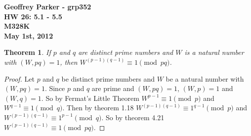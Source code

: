 \documentclass[12pt,leqno]{article}
\numberwithin{equation}{section}
\newtheorem{thm}{Theorem}[section]
\theoremstyle{definition}
\begin{document}
\thispagestyle{plain}
\begin{flushright}
\large{\textbf{Geoffrey Parker - grp352 \\
HW 26: 5.1 - 5.5\\
M328K \\
May 1st, 2012 \\}}
\end{flushright}

\markboth{}{} \setcounter{section}{0} \baselineskip=18pt

\setcounter{tocdepth}{4}



\setcounter{section}{5}

\setcounter{thm}{0}


\begin{thm}
If $p$ and $q$ are distinct prime numbers and $W$ is a natural
number with $(W, pq)=1$, then $W^{(p-1)(q-1)}\equiv 1 \pmod{pq}$.
\end{thm}
\begin{proof}[Proof]
Let $p$ and $q$ be distinct prime numbers and $W$ be a natural number with $(W, pq)=1$.  Since $p$ and $q$ are prime and $(W, pq)=1$, $(W, p) = 1$ and $(W, q) = 1$.  So by Fermat's Little Theorem $W^{p-1} \equiv 1 \pmod{p}$ and $W^{q-1} \equiv 1 \pmod{q}$.  Then by theorem 1.18 $W^{(p-1)(q-1)} \equiv 1^{q-1} \pmod{p}$ and $W^{(p-1)(q-1)} \equiv 1^{p-1} \pmod{q}$.  So by theorem 4.21 $W^{(p-1)(q-1)}\equiv 1 \pmod{pq}$.
\end{proof}

\end{document}
